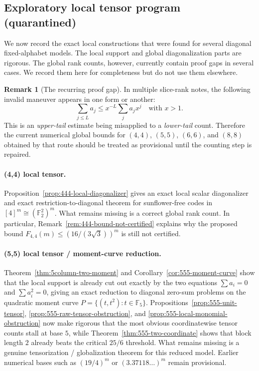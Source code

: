 \documentclass[11pt]{article}
\theoremstyle{definition}
\newtheorem{remark}[theorem]{Remark}
\newcommand{\1}{\mathbf{1}}
\begin{document}
\subsection{Exploratory local tensor program (quarantined)}\label{subsec:exploratory-tensors}
We now record the exact local constructions that were found for several diagonal fixed-alphabet models. The local support and global diagonalization parts are rigorous. The global rank counts, however, currently contain proof gaps in several cases. We record them here for completeness but do not use them elsewhere.

\begin{remark}[The recurring proof gap]
In multiple slice-rank notes, the following invalid maneuver appears in one form or another:
\[
\sum_{j\le L} a_j \le x^{-L}\sum_j a_j x^j
\quad\text{with }x>1.
\]
This is an \emph{upper-tail} estimate being misapplied to a \emph{lower-tail} count. Therefore the current numerical global bounds for $(4,4)$, $(5,5)$, $(6,6)$, and $(8,8)$ obtained by that route should be treated as provisional until the counting step is repaired.
\end{remark}

\paragraph{(4,4) local tensor.}
Proposition~\ref{prop:444-local-diagonalizer} gives an exact local scalar diagonalizer and exact restriction-to-diagonal theorem for sunflower-free codes in $[4]^m\cong (\mathbb F_2^2)^m$. What remains missing is a correct global rank count. In particular, Remark~\ref{rem:444-bound-not-certified} explains why the proposed bound $F_{4,4}(m)\le (16/(3\sqrt 3))^m$ is still not certified.

\paragraph{(5,5) local tensor / moment-curve reduction.}
Theorem~\ref{thm:5column-two-moment} and Corollary~\ref{cor:555-moment-curve} show that the local support is already cut out exactly by the two equations $\sum a_i=0$ and $\sum a_i^2=0$, giving an exact reduction to diagonal zero-sum problems on the quadratic moment curve $P=\{(t,t^2):t\in \mathbb F_5\}$. Propositions~\ref{prop:555-unit-tensor}, \ref{prop:555-raw-tensor-obstruction}, and \ref{prop:555-local-monomial-obstruction} now make rigorous that the most obvious coordinatewise tensor counts stall at base $5$, while Theorem~\ref{thm:555-two-coordinate} shows that block length $2$ already beats the critical $25/6$ threshold. What remains missing is a genuine tensorization / globalization theorem for this reduced model. Earlier numerical bases such as $(19/4)^m$ or $(3.37118\ldots)^m$ remain provisional.
\end{document}
